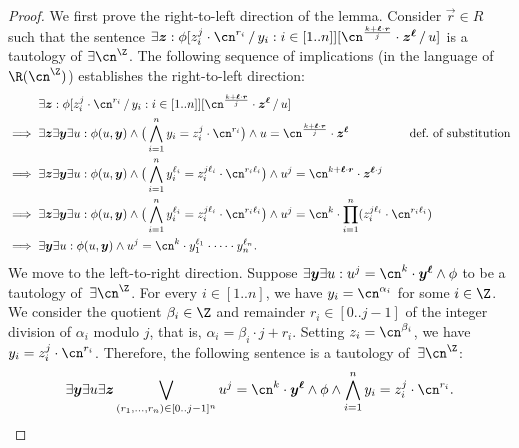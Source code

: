 \LemmaRemoveU*

\begin{proof} 
    We first prove the right-to-left direction of the lemma. Consider $\vec r\in
    R$ such that the sentence $\exists\vec z : \phi\sub{z_i^j \cdot
    \cn^{r_i}}{y_i : i \in [1..n]}\sub{\cn^{\frac{k + \vec \ell \cdot
    \vec{r}}{j}} \cdot \vec z^{\vec \ell}}{u}$ is a tautology of $\exists
    \ipow{\cn}$. The following sequence of implications (in the language of $\R(\ipow{\cn})$) establishes the
    right-to-left direction:
    \begin{align*}
        &\exists\vec z : \phi\sub{z_i^j \cdot \cn^{r_i}}{y_i : i \in [1..n]}\sub{\cn^{\frac{k + \vec \ell \cdot \vec r}{j}} \cdot \vec z^{\vec \ell}}{u}\\
        \implies{}& \exists \vec z \exists\vec y\exists u: \phi(u,\vec y)\land
        \big(\bigwedge_{i=1}^n y_i=z_i^j \cdot \cn^{r_i}\big) \land u=\cn^{\frac{k + \vec \ell \cdot \vec r}{j}} \cdot \vec z^{\vec \ell}
        &\hspace{-1cm}\text{def.~of~substitution}\\
        \implies{}&\exists \vec z \exists\vec y\exists u: \phi(u,\vec y)\land \big(\bigwedge_{i=1}^n y_i^{\ell_i}=z_i^{j\ell_i} \cdot \cn^{r_i\ell_i} \big)\land u^j=\cn^{k + \vec \ell \cdot \vec r} \cdot \vec z^{\vec \ell\cdot j}\\
        \implies{}&\exists \vec z \exists\vec y\exists u: \phi(u,\vec y)\land \big(\bigwedge_{i=1}^n y_i^{\ell_i}=z_i^{j\ell_i} \cdot \cn^{r_i\ell_i} \big)\land u^j=\cn^{k} \cdot \prod_{i=1}^n (z_i^{j\ell_i} \cdot \cn^{r_i\ell_i})\\
        \implies{}&\exists\vec y\exists u: \phi(u,\vec y)\land u^j=\cn^{k}\cdot y_1^{\ell_1}\cdot\cdots \cdot y_n^{\ell_n}.
    \end{align*}
    We move to the left-to-right direction. Suppose $\exists \vec y \exists u :
    u^{j} = \cn^{k} \cdot \vec y^{\vec \ell} \land \phi$ to be a tautology
    of~$\exists \ipow{\cn}$. For every $i \in [1..n]$, we have $y_i =
    \cn^{\alpha_i}$ for some $i \in \Z$. We consider the quotient $\beta_i \in
    \Z$ and remainder $r_i \in [0..j-1]$ of the integer division of $\alpha_i$
    modulo $j$, that is, $\alpha_i = \beta_i \cdot j + r_i$. Setting $z_i =
    \cn^{\beta_i}$, we have $y_i = z_i^j \cdot \cn^{r_i}$. Therefore, the
    following sentence is a tautology of~$\exists\ipow{\cn}$:
    \[
        \exists \vec y \exists u \exists \vec z \bigvee_{(r_1,\dots,r_n) \in [0..j-1]^n} u^{j} = \cn^{k} \cdot \vec y^{\vec \ell} \land \phi \land \bigwedge_{i=1}^n y_i = z_i^j \cdot \cn^{r_i}.
\]
\end{proof}
